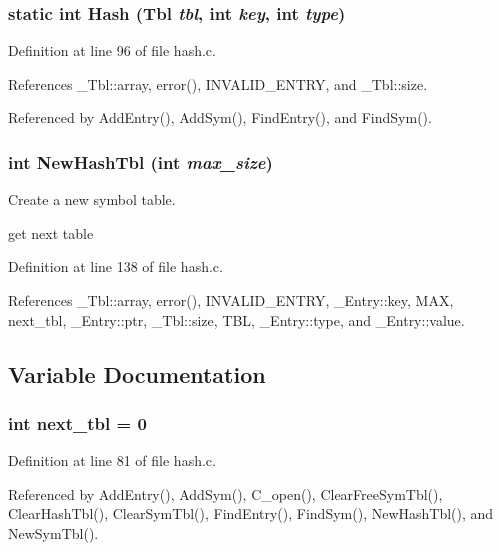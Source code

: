 \subsubsection{\setlength{\rightskip}{0pt plus 5cm}static int Hash (\bf{Tbl} {\em tbl}, int {\em key}, int {\em type})\hspace{0.3cm}{\tt  [static]}}\label{hash_8c_92bee1c5bc6c75d763b4df7669ddf8dc}




Definition at line 96 of file hash.c.

References \_\-Tbl::array, error(), INVALID\_\-ENTRY, and \_\-Tbl::size.

Referenced by Add\-Entry(), Add\-Sym(), Find\-Entry(), and Find\-Sym().
\subsubsection{\setlength{\rightskip}{0pt plus 5cm}int New\-Hash\-Tbl (int {\em max\_\-size})}\label{hash_8c_4ee45a0996e73169eec001797c7d259a}


Create a new symbol table. 

get next table 

Definition at line 138 of file hash.c.

References \_\-Tbl::array, error(), INVALID\_\-ENTRY, \_\-Entry::key, MAX, next\_\-tbl, \_\-Entry::ptr, \_\-Tbl::size, TBL, \_\-Entry::type, and \_\-Entry::value.

\subsection{Variable Documentation}
\subsubsection{\setlength{\rightskip}{0pt plus 5cm}int \bf{next\_\-tbl} = 0\hspace{0.3cm}{\tt  [static]}}\label{hash_8c_8f6d5fcc8b0f003fcb0ac869a190bc2f}




Definition at line 81 of file hash.c.

Referenced by Add\-Entry(), Add\-Sym(), C\_\-open(), Clear\-Free\-Sym\-Tbl(), Clear\-Hash\-Tbl(), Clear\-Sym\-Tbl(), Find\-Entry(), Find\-Sym(), New\-Hash\-Tbl(), and New\-Sym\-Tbl().
